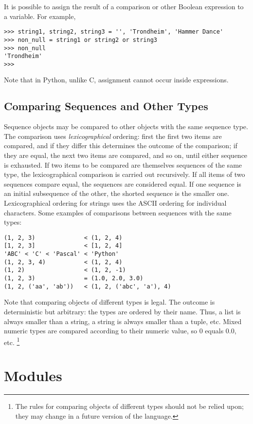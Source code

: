 It is possible to assign the result of a comparison or other Boolean
expression to a variable.  For example,

\bcode\begin{verbatim}
>>> string1, string2, string3 = '', 'Trondheim', 'Hammer Dance'
>>> non_null = string1 or string2 or string3
>>> non_null
'Trondheim'
>>> 
\end{verbatim}\ecode
%
Note that in Python, unlike C, assignment cannot occur inside expressions.

\section{Comparing Sequences and Other Types}

Sequence objects may be compared to other objects with the same
sequence type.  The comparison uses {\em lexicographical} ordering:
first the first two items are compared, and if they differ this
determines the outcome of the comparison; if they are equal, the next
two items are compared, and so on, until either sequence is exhausted.
If two items to be compared are themselves sequences of the same type,
the lexicographical comparison is carried out recursively.  If all
items of two sequences compare equal, the sequences are considered
equal.  If one sequence is an initial subsequence of the other, the
shorted sequence is the smaller one.  Lexicographical ordering for
strings uses the ASCII ordering for individual characters.  Some
examples of comparisons between sequences with the same types:

\bcode\begin{verbatim}
(1, 2, 3)              < (1, 2, 4)
[1, 2, 3]              < [1, 2, 4]
'ABC' < 'C' < 'Pascal' < 'Python'
(1, 2, 3, 4)           < (1, 2, 4)
(1, 2)                 < (1, 2, -1)
(1, 2, 3)              = (1.0, 2.0, 3.0)
(1, 2, ('aa', 'ab'))   < (1, 2, ('abc', 'a'), 4)
\end{verbatim}\ecode
%
Note that comparing objects of different types is legal.  The outcome
is deterministic but arbitrary: the types are ordered by their name.
Thus, a list is always smaller than a string, a string is always
smaller than a tuple, etc.  Mixed numeric types are compared according
to their numeric value, so 0 equals 0.0, etc.%
\footnote{
        The rules for comparing objects of different types should
        not be relied upon; they may change in a future version of
        the language.
}


\chapter{Modules}

